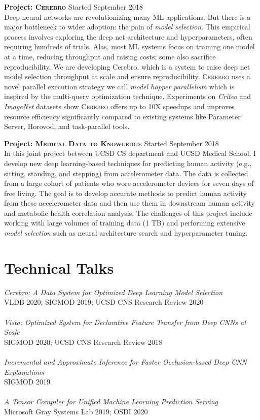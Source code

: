 \documentclass[margin]{res}
\begin{document}
\begin{resume}
\textbf{Project: \textsc{Cerebro}} \hfill Started September 2018\\
Deep neural networks are revolutionizing many ML applications.
But there is a major bottleneck to wider adoption: the pain of \textit{model selection}.
This empirical process involves exploring the deep net architecture and hyperparameters, often requiring hundreds of trials.
Alas, most ML systems focus on training one model at a time, reducing throughput and raising costs; some also sacrifice reproducibility.
We are developing {Cerebro}, which is a system to raise deep net model selection throughput at scale and ensure reproducibility.
\textsc{Cerebro} uses a novel parallel execution strategy we call \textit{model hopper parallelism} which is inspired by the multi-query optimization technique.
Experiments on \textit{Criteo} and \textit{ImageNet} datasets show \textsc{Cerebro} offers up to 10X speedups and improves resource efficiency significantly compared to existing systems like Parameter Server, Horovod, and task-parallel tools.


\textbf{Project: \textsc{Medical Data to Knowledge}} \hfill Started September 2018\\
In this joint project between UCSD CS department and UCSD Medical School, I develop new deep learning-based techniques for predicting human activity (e.g., sitting, standing, and stepping) from accelerometer data. The data is collected from a large cohort of patients who wore accelerometer devices for seven days of free living. The goal is to develop accurate methods to predict human activity from these accelerometer data and then use them in downstream human activity and metabolic health correlation analysis. The challenges of this project include working with large volumes of training data (1 TB) and performing extensive \textit{model selection} such as neural architecture search and hyperparameter tuning.


\section{Technical Talks}
\textit{Cerebro: A Data System for Optimized Deep Learning Model Selection}\\ VLDB 2020; SIGMOD 2019; UCSD CNS Research Review 2020\\\\
\textit{Vista: Optimized System for Declarative Feature Transfer from Deep CNNs at Scale}\\ SIGMOD 2020; UCSD CNS Research Review 2018\\\\
\textit{Incremental and Approximate Inference for Faster Occlusion-based Deep CNN Explanations}\\ SIGMOD 2019\\\\
\textit{A Tensor Compiler for Unified Machine Learning Prediction Serving}\\ Microsoft Gray Systems Lab 2019; OSDI 2020\\


\end{resume}
\end{document}
